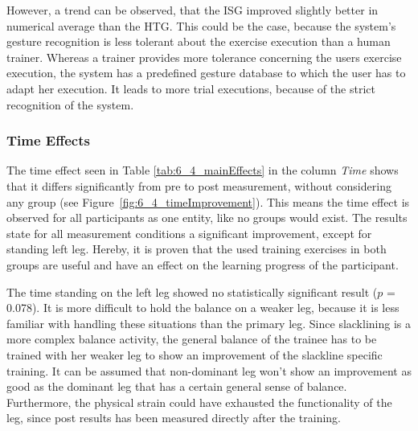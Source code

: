 
However, a trend can be observed, that the ISG improved slightly better in numerical average than the HTG.
This could be the case, because the system's gesture recognition is less tolerant about the exercise execution than a human trainer.
Whereas a trainer provides more tolerance concerning the users exercise execution, the system has a predefined gesture database to which the user has to adapt her execution.
It leads to more trial executions, because of the strict recognition of the system.

\subsubsection{Time Effects}
The time effect seen in Table \ref{tab:6_4_mainEffects} in the column \textit{Time} shows that it differs significantly from pre to post measurement, without considering any group (see Figure~\ref{fig:6_4_timeImprovement}).
This means the time effect is observed for all participants as one entity, like no groups would exist.
The results state for all measurement conditions a significant improvement, except for standing left leg.
Hereby, it is proven that the used training exercises in both groups are useful and have an effect on the learning progress of the participant.

The time standing on the left leg showed no statistically significant result ($p$ = 0.078).
It is more difficult to hold the balance on a weaker leg, because it is less familiar with handling these situations than the primary leg.
Since slacklining is a more complex balance activity, the general balance of the trainee has to be trained with her weaker leg to show an improvement of the slackline specific training.
It can be assumed that non-dominant leg won't show an improvement as good as the dominant leg that has a certain general sense of balance.
Furthermore, the physical strain could have exhausted the functionality of the leg, since post results has been measured directly after the training.

